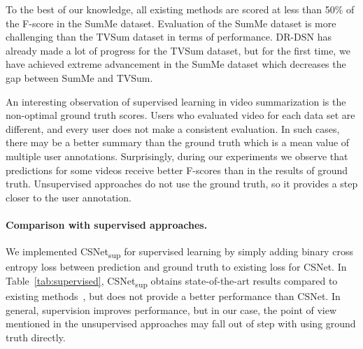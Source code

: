 \documentclass[letterpaper]{article} \usepackage{aaai19}  \usepackage{times}  \usepackage{helvet}  \usepackage{courier}  \usepackage{url}  \usepackage{graphicx}  \frenchspacing  \setlength{\pdfpagewidth}{8.5in}  \setlength{\pdfpageheight}{11in}
\newcommand{\tabref}[1]{Table~\ref{#1}}
\begin{document}
To the best of our knowledge, all existing methods are scored at less than 50\% of the F-score in the SumMe dataset. Evaluation of the SumMe dataset is more challenging than the TVSum dataset in terms of performance. DR-DSN has already made a lot of progress for the TVSum dataset, but for the first time, we have achieved extreme advancement in the SumMe dataset which decreases the gap between SumMe and TVSum. 

An interesting observation of supervised learning in video summarization is the non-optimal ground truth scores. Users who evaluated video for each data set are different, and every user does not make a consistent evaluation. In such cases, there may be a better summary than the ground truth which is a mean value of multiple user annotations. Surprisingly, during our experiments we observe that predictions for some videos receive better F-scores than in the results of ground truth. Unsupervised approaches do not use the ground truth, so it provides a step closer to the user annotation. 



\begin{table}
\centering
{}
\caption{F-score (\%) of supervised methods in canonical setting on SumMe and TVSum datasets. We achieve the state-of-the-art performance.}
\label{tab:supervised}
\end{table}


\paragraph{Comparison with supervised approaches.}
We implemented CSNet\textsubscript{sup} for supervised learning by simply adding binary cross entropy loss between prediction and ground truth to existing loss for CSNet. In \tabref{tab:supervised}, CSNet\textsubscript{sup} obtains state-of-the-art results compared to existing methods~\cite{gygli2014creating,gygli2015video,zhang2016summary,zhang2016video,zhou2017deep}, but does not provide a better performance than CSNet. In general, supervision improves performance, but in our case, the point of view mentioned in the unsupervised approaches may fall out of step with using ground truth directly. 
\end{document}
